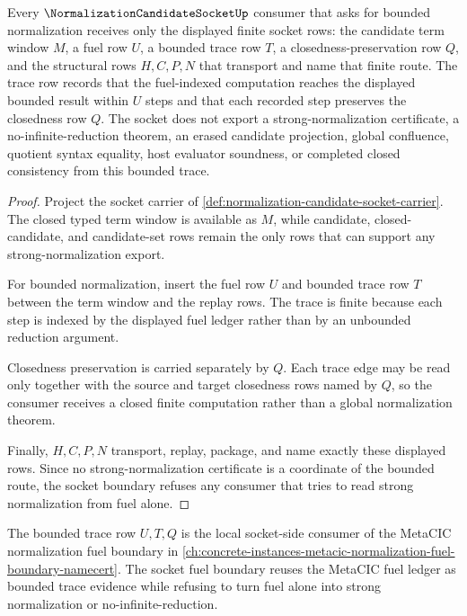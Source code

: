 \begin{theorem}
\label{thm:normalization-candidate-socket-fuel-boundary}
Every $\NormalizationCandidateSocketUp$ consumer that asks for bounded normalization receives only the displayed finite socket rows: the candidate term window $M$, a fuel row $U$, a bounded trace row $T$, a closedness-preservation row $Q$, and the structural rows $H,C,P,N$ that transport and name that finite route. The trace row records that the fuel-indexed computation reaches the displayed bounded result within $U$ steps and that each recorded step preserves the closedness row $Q$. The socket does not export a strong-normalization certificate, a no-infinite-reduction theorem, an erased candidate projection, global confluence, quotient syntax equality, host evaluator soundness, or completed closed consistency from this bounded trace.
\end{theorem}
\begin{proof}
Project the socket carrier of \autoref{def:normalization-candidate-socket-carrier}. The closed typed term window is available as $M$, while candidate, closed-candidate, and candidate-set rows remain the only rows that can support any strong-normalization export.

For bounded normalization, insert the fuel row $U$ and bounded trace row $T$ between the term window and the replay rows. The trace is finite because each step is indexed by the displayed fuel ledger rather than by an unbounded reduction argument.

Closedness preservation is carried separately by $Q$. Each trace edge may be read only together with the source and target closedness rows named by $Q$, so the consumer receives a closed finite computation rather than a global normalization theorem.

Finally, $H,C,P,N$ transport, replay, package, and name exactly these displayed rows. Since no strong-normalization certificate is a coordinate of the bounded route, the socket boundary refuses any consumer that tries to read strong normalization from fuel alone.
\end{proof}

The bounded trace row $U,T,Q$ is the local socket-side consumer of the MetaCIC normalization fuel boundary in \autoref{ch:concrete-instances-metacic-normalization-fuel-boundary-namecert}. The socket fuel boundary reuses the MetaCIC fuel ledger as bounded trace evidence while refusing to turn fuel alone into strong normalization or no-infinite-reduction.

